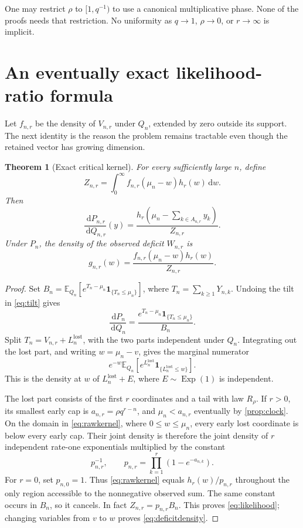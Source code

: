 \documentclass[11pt,oneside]{article}
\numberwithin{equation}{section}
\theoremstyle{plain}
\newtheorem{theorem}{Theorem}[section]
\theoremstyle{definition}
\theoremstyle{remark}
\newcommand{\E}{\mathbb E}
\newcommand{\ind}{\mathbf 1}
\newcommand{\dd}{\,\mathrm d}
\newcommand{\Exp}{\operatorname{Exp}}
\begin{document}
One may restrict $\rho$ to $[1,q^{-1})$ to use a canonical multiplicative
phase. None of the proofs needs that restriction. No uniformity as
$q\to1$, $\rho\to0$, or $r\to\infty$ is implicit.

\section{An eventually exact likelihood-ratio formula}
\label{sec:likelihood}
Let $f_{n,r}$ be the density of $V_{n,r}$ under $Q_n$, extended by zero
outside its support. The next identity is the reason the problem remains
tractable even though the retained vector has growing dimension.

\begin{theorem}[Exact critical kernel]\label{thm:exact}
For every sufficiently large $n$, define
\begin{equation}\label{eq:Z}
 Z_{n,r}=\int_0^\infty f_{n,r}(\mu_n-w)h_r(w)\dd w.
\end{equation}
Then
\begin{equation}\label{eq:likelihood}
 \frac{\dd P_{n,r}}{\dd Q_{n,r}}(y)
   =\frac{h_r(\mu_n-\sum_{k\in A_{n,r}}y_k)}{Z_{n,r}}.
\end{equation}
Under $P_n$, the density of the observed deficit $W_{n,r}$ is
\begin{equation}\label{eq:deficitdensity}
 g_{n,r}(w)=\frac{f_{n,r}(\mu_n-w)h_r(w)}{Z_{n,r}}.
\end{equation}
\end{theorem}
\begin{proof}
Set $B_n=\E_{Q_n}[e^{T_n-\mu_n}\ind_{\{T_n\le\mu_n\}}]$, where
$T_n=\sum_{k\ge1}Y_{n,k}$. Undoing the tilt in \eqref{eq:tilt} gives
\[
 \frac{\dd P_n}{\dd Q_n}
 =\frac{e^{T_n-\mu_n}\ind_{\{T_n\le\mu_n\}}}{B_n}.
\]
Split $T_n=V_{n,r}+L_n^{\mathrm{lost}}$, with the two parts independent
under $Q_n$. Integrating out the lost part, and writing
$w=\mu_n-v$, gives the marginal numerator
\begin{equation}\label{eq:rawkernel}
 e^{-w}\E_{Q_n}\!
   [e^{L_n^{\mathrm{lost}}}\ind_{\{L_n^{\mathrm{lost}}\le w\}}].
\end{equation}
This is the density at $w$ of $L_n^{\mathrm{lost}}+E$, where
$E\sim\Exp(1)$ is independent.

The lost part consists of the first $r$ coordinates and a tail with
law $R_\rho$. If $r>0$, its smallest early cap is
$a_{n,r}=\rho q^{r-n}$, and $\mu_n<a_{n,r}$ eventually by
\cref{prop:clock}. On the domain in \eqref{eq:rawkernel}, where
$0\le w\le\mu_n$, every early lost coordinate is below every early
cap. Their joint density is therefore the joint density of $r$
independent rate-one exponentials multiplied by the constant
\[
 p_{n,r}^{-1},\qquad
 p_{n,r}=\prod_{k=1}^r(1-e^{-a_{n,k}}).
\]
For $r=0$, set $p_{n,0}=1$. Thus \eqref{eq:rawkernel} equals
$h_r(w)/p_{n,r}$ throughout the only region accessible to the
nonnegative observed sum. The same constant occurs in $B_n$, so it
cancels. In fact $Z_{n,r}=p_{n,r}B_n$. This proves
\eqref{eq:likelihood}; changing variables from $v$ to $w$ proves
\eqref{eq:deficitdensity}.
\end{proof}
\end{document}
